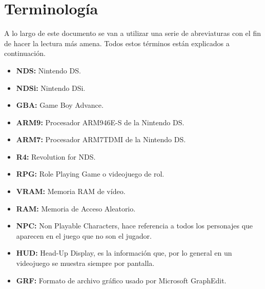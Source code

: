 
\chapter{Terminología}

A  lo largo de este documento se van a utilizar una serie de abreviaturas con el fin de hacer la lectura más amena. Todos estos términos están explicados a continuación.

\begin{itemize}
  \item \textbf{NDS:} Nintendo DS.
  \item \textbf{NDSi:} Nintendo DSi.
  \item \textbf{GBA:} Game Boy Advance.
  \item \textbf{ARM9:} Procesador ARM946E-S de la Nintendo DS.
  \item \textbf{ARM7:} Procesador ARM7TDMI de la Nintendo DS.
  \item \textbf{R4:} Revolution for NDS.
  \item \textbf{RPG:} Role Playing Game o videojuego de rol. 
  \item \textbf{VRAM:} Memoria RAM de vídeo.
  \item \textbf{RAM:} Memoria de Acceso Aleatorio.
  \item \textbf{NPC:} Non Playable Characters, hace referencia a todos los personajes que aparecen en el juego que no son el jugador.
  \item \textbf{HUD:} Head-Up Display, es la información que, por lo general en un videojuego se muestra siempre por pantalla.
  \item \textbf{GRF:} Formato de archivo gráfico usado por Microsoft GraphEdit.
\end{itemize}
